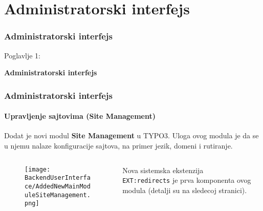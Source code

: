 %

\section{Administratorski interfejs}
\begin{frame}[fragile]
	\frametitle{Administratorski interfejs}

	\begin{center}\huge{Poglavlje 1:}\end{center}
	\begin{center}\huge{\color{typo3darkgrey}\textbf{Administratorski interfejs}}\end{center}

\end{frame}


\begin{frame}[fragile]
	\frametitle{Administratorski interfejs}
	\framesubtitle{Upravljenje sajtovima (Site Management)}

	Dodat je novi modul \textbf{Site Management} u TYPO3.
	Uloga ovog modula je da se u njemu nalaze konfiguracije sajtova, na primer jezik, domeni i rutiranje.
	\begin{columns}[T]
		\begin{column}{.4\textwidth}
			\begin{figure}\vspace*{-0.4cm}
				\texttt{[image: BackendUserInterface/AddedNewMainModuleSiteManagement.png]}
			\end{figure}
		\end{column}
		\begin{column}{.5\textwidth}
			Nova sistemska ekstenzija \texttt{EXT:redirects} je prva komponenta ovog modula (detalji su na sledecoj stranici).
		\end{column}
		\begin{column}{.1\textwidth}
		\end{column}
	\end{columns}

\end{frame}

